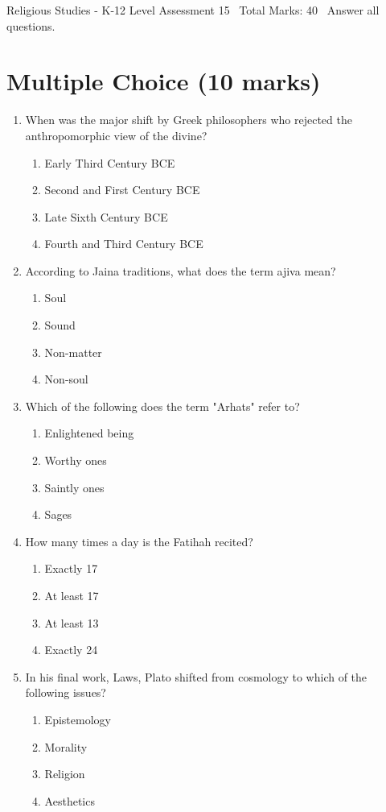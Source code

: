 \documentclass[12pt]{article}
\begin{document}
\begin{center}
Religious Studies - K-12 Level Assessment 15 \
Total Marks: 40 \
Answer all questions.
\end{center}

\section*{Multiple Choice (10 marks)}
\begin{enumerate}[label=\arabic*.]
\item When was the major shift by Greek philosophers who rejected the anthropomorphic view of the divine?
\begin{enumerate}[label=(\alph*)]
    \item Early Third Century BCE
    \item Second and First Century BCE
    \item Late Sixth Century BCE
    \item Fourth and Third Century BCE
\end{enumerate}
\item According to Jaina traditions, what does the term ajiva mean?
\begin{enumerate}[label=(\alph*)]
    \item Soul
    \item Sound
    \item Non-matter
    \item Non-soul
\end{enumerate}
\item Which of the following does the term "Arhats" refer to?
\begin{enumerate}[label=(\alph*)]
    \item Enlightened being
    \item Worthy ones
    \item Saintly ones
    \item Sages
\end{enumerate}
\item How many times a day is the Fatihah recited?
\begin{enumerate}[label=(\alph*)]
    \item Exactly 17
    \item At least 17
    \item At least 13
    \item Exactly 24
\end{enumerate}
\item In his final work, Laws, Plato shifted from cosmology to which of the following issues?
\begin{enumerate}[label=(\alph*)]
    \item Epistemology
    \item Morality
    \item Religion
    \item Aesthetics
\end{enumerate}
\end{enumerate}
\end{document}
